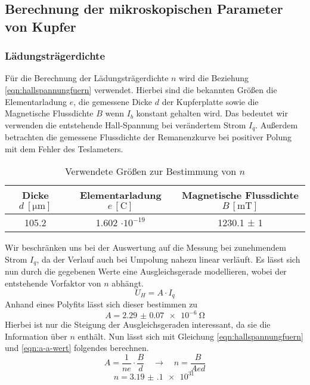 \subsection{Berechnung der mikroskopischen Parameter von Kupfer}
\subsubsection{Lädungsträgerdichte}
Für die Berechnung der Lädungsträgerdichte $n$ wird die Beziehung \eqref{eqn:hallspannungfuern} verwendet. Hierbei sind die 
bekannten Größen die Elementarladung $e$, die gemessene Dicke $d$ der Kupferplatte sowie die Magnetische Flussdichte $B$ wenn $I_{b}$ konstant gehalten wird.
Das bedeutet wir verwenden die entstehende Hall-Spannung bei verändertem Strom $I_{q}$.
Außerdem betrachten die gemessene Flussdichte der Remanenzkurve bei positiver Polung mit dem Fehler des Teslameters.
\begin{table}
  \centering
  \caption{Verwendete Größen zur Bestimmung von $n$}
  \label{tab:nbestimmung}
  \begin{tabular}{c c c}
    Dicke {$d \: [\si{\micro\meter}]$} & Elementarladung $e \, [\si{\coulomb}]$ & Magnetische Flussdichte $B \, [\si{\milli\tesla}]$ \\
    \midrule
    105.2   & 1.602 $\cdot 10^{-19}$ & 1230.1 ± 1 \\
    \bottomrule
  \end{tabular}
\end{table}
Wir beschränken uns bei der Auswertung auf die Messung bei zunehmendem Strom ${I_{q}}$, da der Verlauf auch bei Umpolung nahezu linear verläuft.
Es lässt sich nun durch die gegebenen Werte eine Ausgleichsgerade modellieren, wobei der entstehende Vorfaktor von $n$ abhängt.
\begin{equation}
U_{H} = A \cdot I_{q}
\end{equation}
Anhand eines Polyfits lässt sich dieser bestimmen zu
\begin{equation}
\label{eqn:a-a-wert}
A = \SI{2.29(7)e-6}{\ohm}
\end{equation}
Hierbei ist nur die Steigung der Ausgleichsgeraden interessant, da sie die Information über $n$ enthält.
Nun lässt sich mit Gleichung \eqref{eqn:hallspannungfuern} und \eqref{eqn:a-a-wert} folgendes berechnen.
\begin{equation}
A = \frac{1}{n e} \cdot \frac{B}{d} \quad \to \quad n = \frac{B}{Aed}
\end{equation}
\begin{equation}
n = \SI{3.19(10)e31}{}
\end{equation}